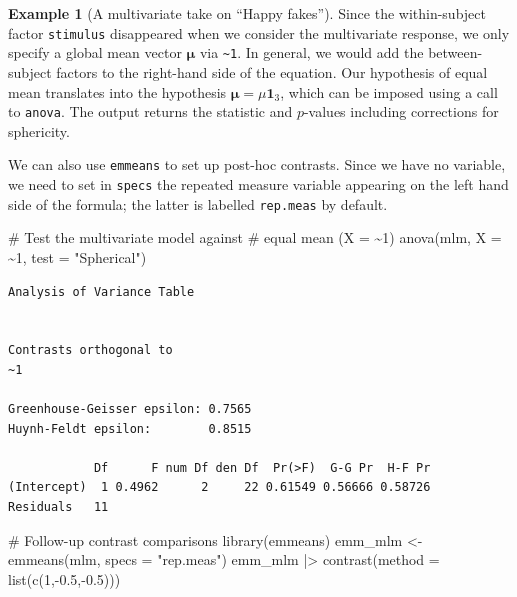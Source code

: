\documentclass[
  11pt,
  letterpaper,
]{scrbook}
\newenvironment{Shaded}{\begin{snugshade}}{\end{snugshade}}
\newcommand{\AttributeTok}[1]{\textcolor[rgb]{0.40,0.45,0.13}{#1}}
\newcommand{\CommentTok}[1]{\textcolor[rgb]{0.37,0.37,0.37}{#1}}
\newcommand{\DecValTok}[1]{\textcolor[rgb]{0.68,0.00,0.00}{#1}}
\newcommand{\FloatTok}[1]{\textcolor[rgb]{0.68,0.00,0.00}{#1}}
\newcommand{\FunctionTok}[1]{\textcolor[rgb]{0.28,0.35,0.67}{#1}}
\newcommand{\NormalTok}[1]{\textcolor[rgb]{0.00,0.23,0.31}{#1}}
\newcommand{\OtherTok}[1]{\textcolor[rgb]{0.00,0.23,0.31}{#1}}
\newcommand{\SpecialCharTok}[1]{\textcolor[rgb]{0.37,0.37,0.37}{#1}}
\newcommand{\StringTok}[1]{\textcolor[rgb]{0.13,0.47,0.30}{#1}}
\theoremstyle{definition}
\theoremstyle{definition}
\newtheorem{example}{Example}[chapter]
\theoremstyle{remark}
\begin{document}
\begin{example}[A multivariate take on ``Happy
fakes'']
Since the within-subject factor \texttt{stimulus} disappeared when we
consider the multivariate response, we only specify a global mean vector
\(\boldsymbol{\mu}\) via \texttt{\textasciitilde{}1}. In general, we
would add the between-subject factors to the right-hand side of the
equation. Our hypothesis of equal mean translates into the hypothesis
\(\boldsymbol{\mu} = \mu\boldsymbol{1}_3\), which can be imposed using a
call to \texttt{anova}. The output returns the statistic and
\(p\)-values including corrections for sphericity.

We can also use \texttt{emmeans} to set up post-hoc contrasts. Since we
have no variable, we need to set in \texttt{specs} the repeated measure
variable appearing on the left hand side of the formula; the latter is
labelled \texttt{rep.meas} by default.

\begin{Shaded}
\begin{Highlighting}[]
\CommentTok{\# Test the multivariate model against}
\CommentTok{\# equal mean (X = \textasciitilde{}1)}
\FunctionTok{anova}\NormalTok{(mlm, }\AttributeTok{X =} \SpecialCharTok{\textasciitilde{}}\DecValTok{1}\NormalTok{, }\AttributeTok{test =} \StringTok{"Spherical"}\NormalTok{)}
\end{Highlighting}
\end{Shaded}

\begin{verbatim}
Analysis of Variance Table


Contrasts orthogonal to
~1

Greenhouse-Geisser epsilon: 0.7565
Huynh-Feldt epsilon:        0.8515

            Df      F num Df den Df  Pr(>F)  G-G Pr  H-F Pr
(Intercept)  1 0.4962      2     22 0.61549 0.56666 0.58726
Residuals   11                                             
\end{verbatim}

\begin{Shaded}
\begin{Highlighting}[]
\CommentTok{\# Follow{-}up contrast comparisons}
\FunctionTok{library}\NormalTok{(emmeans)}
\NormalTok{emm\_mlm }\OtherTok{\textless{}{-}} \FunctionTok{emmeans}\NormalTok{(mlm, }\AttributeTok{specs =} \StringTok{"rep.meas"}\NormalTok{) }
\NormalTok{emm\_mlm }\SpecialCharTok{|\textgreater{}} \FunctionTok{contrast}\NormalTok{(}\AttributeTok{method =} \FunctionTok{list}\NormalTok{(}\FunctionTok{c}\NormalTok{(}\DecValTok{1}\NormalTok{,}\SpecialCharTok{{-}}\FloatTok{0.5}\NormalTok{,}\SpecialCharTok{{-}}\FloatTok{0.5}\NormalTok{)))}
\end{Highlighting}
\end{Shaded}


\end{example}
\end{document}
